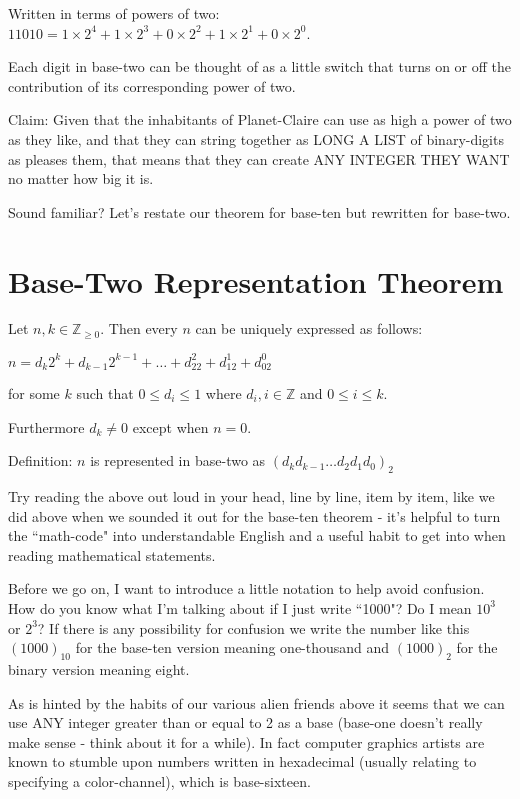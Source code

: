 \documentclass{article}
\newenvironment{jprIn}{\begin{adjustwidth}{2em}{}}{\end{adjustwidth}}
\begin{document}
Written in terms of powers of two: $11010=1\times2^4+1\times2^3+0\times2^2+1\times2^1+0\times2^0$.

Each digit in base-two can be thought of as a little switch that
turns on or off the contribution of its corresponding power of two.

Claim: Given that the inhabitants of Planet-Claire can use as high a power of two as they like,
and that they can string together as LONG A LIST of binary-digits as pleases them,
that means that they can create ANY INTEGER THEY WANT no matter how big it is.

Sound familiar? Let's restate our theorem for base-ten but rewritten for base-two.

\section*{Base-Two Representation Theorem}

\begin{jprIn}
Let $n,k\in \mathbb{Z}_{\ge 0}$. Then every $n$ can be uniquely expressed as follows:

\hspace{3em}$n=d_k2^k+d_{k-1}2^{k-1}+\dots+d_22^2+d_12^1+d_02^0$

for some $k$ such that $0 \le d_i \le 1$ where $d_i,i\in\mathbb{Z}$ and $0 \le i \le k$.

Furthermore $d_k\ne0$ except when $n=0$.

Definition: $n$ is represented in base-two as $(d_kd_{k-1}\dots{}d_2d_1d_0)_2$
\end{jprIn}
\bigskip

Try reading the above out loud in your head,
line by line, item by item, like we did above when
we sounded it out for the base-ten theorem - it's
helpful to turn the ``math-code" into understandable
English and a useful habit to get into when reading mathematical statements.

Before we go on,
I want to introduce a little notation to help avoid confusion.
How do you know what I'm talking about if I just
write ``1000"? Do I mean $10^3$ or $2^3$?
If there is any possibility for confusion we write
the number like this $(1000)_{10}$ 
for the base-ten version meaning one-thousand and $(1000)_2$
for the binary version meaning eight.

As is hinted by the habits of our various alien friends
above it seems that we can use ANY integer greater than
or equal to 2 as a base (base-one doesn't really make
sense - think about it for a while).
In fact computer graphics artists are known
to stumble upon numbers written in hexadecimal (usually relating to specifying a color-channel),
which is base-sixteen.
\end{document}
